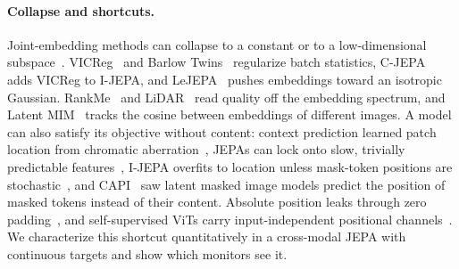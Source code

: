 \paragraph{Collapse and shortcuts.} Joint-embedding methods can collapse to a constant or to a low-dimensional subspace~\cite{jing2022understanding,hua2021feature}. VICReg~\cite{bardes2022vicreg} and Barlow Twins~\cite{zbontar2021barlow} regularize batch statistics, C-JEPA~\cite{mo2024connecting} adds VICReg to I-JEPA, and LeJEPA~\cite{balestriero2025lejepa} pushes embeddings toward an isotropic Gaussian. RankMe~\cite{garrido2023rankme} and LiDAR~\cite{thilak2024lidar} read quality off the embedding spectrum, and Latent MIM~\cite{wei2024towards} tracks the cosine between embeddings of different images. A model can also satisfy its objective without content: context prediction learned patch location from chromatic aberration~\cite{doersch2015unsupervised}, JEPAs can lock onto slow, trivially predictable features~\cite{sobal2022joint}, I-JEPA overfits to location unless mask-token positions are stochastic~\cite{bar2024stochastic}, and CAPI~\cite{darcet2025cluster} saw latent masked image models predict the position of masked tokens instead of their content. Absolute position leaks through zero padding~\cite{islam2020much,kayhan2020translation}, and self-supervised ViTs carry input-independent positional channels~\cite{yang2024denoising,pawlowsky2026dino}. We characterize this shortcut quantitatively in a cross-modal JEPA with continuous targets and show which monitors see it.
